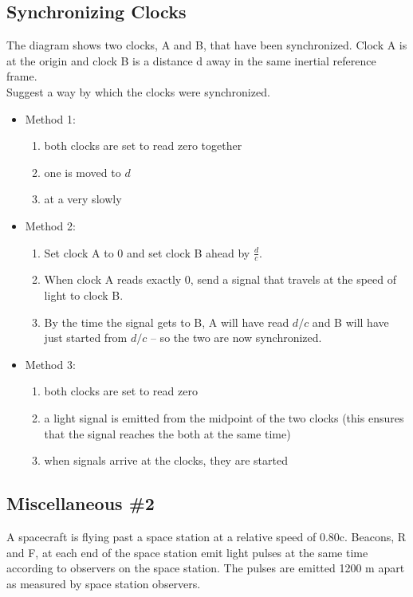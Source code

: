\documentclass[a4paper,12pt]{article}
\newcommand{\lb}{\\[8pt]}
\begin{document}
\pagebreak

\subsection{Synchronizing Clocks}


The diagram shows two clocks, A and B, that have been synchronized. Clock A is at the origin and clock B is a distance d away in the same inertial reference frame.\lb
Suggest a way by which the clocks were synchronized.
\begin{itemize}
  \item Method 1:
        \begin{enumerate}
          \item both clocks are set to read zero together
          \item one is moved to $d$
          \item at a very slowly
        \end{enumerate}
  \item Method 2:
        \begin{enumerate}
          \item Set clock A to 0 and set clock B ahead by $\frac{d}{c}$.
          \item When clock A reads exactly 0, send a signal that travels at the speed of light to clock B.
          \item By the time the signal gets to B, A will have read $d/c$ and B will have just started from $d/c$ -- so the two are now synchronized.
        \end{enumerate}
  \item Method 3:
        \begin{enumerate}
          \item both clocks are set to read zero
          \item a light signal is emitted from the midpoint of the two clocks (this ensures that the signal reaches the both at the same time)
          \item when signals arrive at the clocks, they are started
        \end{enumerate}
\end{itemize}

\pagebreak

\subsection{Miscellaneous \#2}

A spacecraft is flying past a space station at a relative speed of 0.80c. Beacons, R and F, at each end of the space station emit light pulses at the same time according to observers on the space station. The pulses are emitted 1200 m apart as measured by space station observers.
\end{document}
